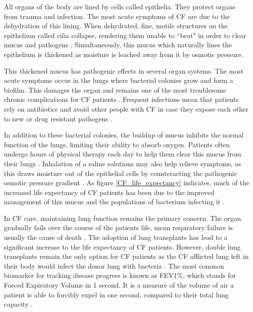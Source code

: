 All organs of the body are lined by cells called epithelia. They protect organs from trauma and infection. The most acute symptoms of CF are due to the dehydration of this lining. When dehydrated, fine, motile structures on the epithelium called cilia collapse, rendering them unable to ``beat" in order to clear mucus and pathogens \cite{boucher2007, szczesniak2017}. Simultaneously, this mucus which naturally lines the epithelium is thickened as moisture is leached away from it by osmotic pressure.

This thickened mucus has pathogenic effects in several organ systems. The most acute symptoms occur in the lungs where bacterial colonies grow and form a biofilm. This damages the organ and remains one of the most troublesome chronic complications for CF patients \cite{chiappini2014}. Frequent infections mean that patients rely on antibiotics and avoid other people with CF in case they expose each other to new or drug resistant pathogens \cite{conway2008, baldoni2019}. 

In addition to these bacterial colonies, the buildup of mucus inhibits the normal function of the lungs, limiting their ability to absorb oxygen. Patients often undergo hours of physical therapy each day to help them clear this mucus from their lungs \cite{chest_pt_CFF,thefreylife2015}. Inhalation of a saline solutions may also help relieve symptoms, as this draws moisture out of the epithelial cells by counteracting the pathogenic osmotic pressure gradient \cite{wark2018}.  As figure \ref{CF_life_expectancy} indicates, much of the increased life expectancy of CF patients has been due to the improved management of this mucus and the populations of bacterium infecting it \cite{mcbennett2022}. 

In CF care, maintaining lung function remains the primary concern. The organ gradually fails over the course of the patients life, mean respiratory failure is usually the cause of death \cite{kumar2018}. The adoption of lung transplants has lead to a significant increase to the life expectancy of CF patients. However, double lung transplants remain the only option for CF patients as the CF afflicted lung left in their body would infect the donor lung with bacteria \cite{mcbennett2022}. The most common biomarker for tracking disease progress is known as FEV1\%, which stands for Forced Expiratory Volume in 1 second. It is a measure of the volume of air a patient is able to forcibly expel in one second, compared to their total lung capacity \cite{szczesniak2017}. 

